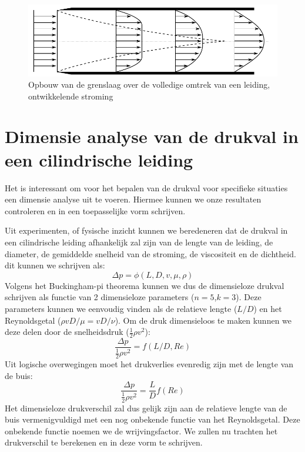 \begin{figure}[htb]
	\centering
	\includegraphics{fig/inwendige_stroming/Ontwikkelende_stroming}
	\caption{Opbouw van de grenslaag over de volledige omtrek van een leiding, ontwikkelende stroming}
	\label{fig:Ontwikkelende_stroming}
\end{figure}

	\section{Dimensie analyse van de drukval in een cilindrische leiding}
	\label{sec:Dimensie analyse van de drukval in een cilindrische leiding}
Het is interessant om voor het bepalen van de drukval voor specifieke situaties een dimensie analyse uit te voeren. Hiermee kunnen we onze resultaten controleren en in een toepasselijke vorm schrijven.

Uit experimenten, of fysische inzicht kunnen we beredeneren dat de drukval in een cilindrische leiding afhankelijk zal zijn van de lengte van de leiding, de diameter, de gemiddelde snelheid van de stroming, de viscositeit en de dichtheid.
dit kunnen we schrijven als:
\begin{equation}
	\Delta p = \phi(L,D,v,\mu,\rho)
\end{equation}
Volgens het Buckingham-pi theorema kunnen we dus de dimensieloze drukval schrijven als functie van 2 dimensieloze parameters ($n=5$,$k=3$). Deze parameters kunnen we eenvoudig vinden als de relatieve lengte ($L/D$) en het Reynoldsgetal ($\rho v D/\mu = v D/\nu$). Om de druk dimensieloos te maken kunnen we deze delen door de snelheidsdruk ($\frac{1}{2} \rho v^2$):
\begin{equation}
	\frac{\Delta p}{\frac{1}{2}\rho v^2} = f(L/D,Re)
\end{equation}
Uit logische overwegingen moet het drukverlies evenredig zijn met de lengte van de buis:
\begin{equation}
	\frac{\Delta p}{\frac{1}{2}\rho v^2} = \frac{L}{D} f(Re)
	\label{eqn:dimensie analyse drukval laminair}
\end{equation}
Het dimensieloze drukverschil zal dus gelijk zijn aan de relatieve lengte van de buis vermenigvuldigd met een nog onbekende functie van het Reynoldsgetal. Deze onbekende functie noemen we de wrijvingsfactor. We zullen nu trachten het drukverschil te berekenen en in deze vorm te schrijven.
	
